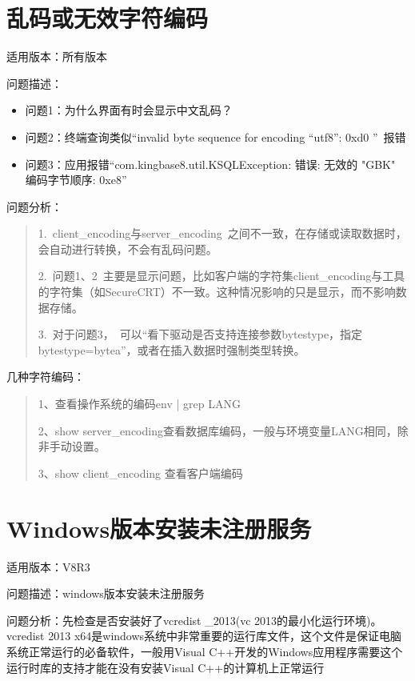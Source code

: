 \documentclass[a4,10pt,oneside,english]{sphinxmanual}
\begin{document}
\section{乱码或无效字符编码}
\label{\detokenize{sql:id7}}
适用版本：所有版本

问题描述：
\begin{itemize}
\item {} 
问题1：为什么界面有时会显示中文乱码？

\item {} 
问题2：终端查询类似“invalid byte sequence for encoding “utf8”: 0xd0 ” 报错

\item {} 
问题3：应用报错“com.kingbase8.util.KSQLException: 错误: 无效的 "GBK" 编码字节顺序: 0xe8”

\end{itemize}

问题分析：
\begin{quote}

1. client\_encoding与server\_encoding 之间不一致，在存储或读取数据时，会自动进行转换，不会有乱码问题。

2. 问题1、2 主要是显示问题，比如客户端的字符集client\_encoding与工具的字符集（如SecureCRT）不一致。这种情况影响的只是显示，而不影响数据存储。

3. 对于问题3， 可以“看下驱动是否支持连接参数bytestype，指定bytestype=bytea”，或者在插入数据时强制类型转换。
\end{quote}

几种字符编码：
\begin{quote}

1、查看操作系统的编码env | grep LANG

2、show server\_encoding查看数据库编码，一般与环境变量LANG相同，除非手动设置。

3、show client\_encoding 查看客户端编码
\end{quote}


\section{Windows版本安装未注册服务}
\label{\detokenize{sql:windows}}
适用版本：V8R3

问题描述：windows版本安装未注册服务

问题分析：先检查是否安装好了vcredist \_2013(vc 2013的最小化运行环境)。vcredist 2013 x64是windows系统中非常重要的运行库文件，这个文件是保证电脑系统正常运行的必备软件，一般用Visual C++开发的Windows应用程序需要这个运行时库的支持才能在没有安装Visual C++的计算机上正常运行
\end{document}
